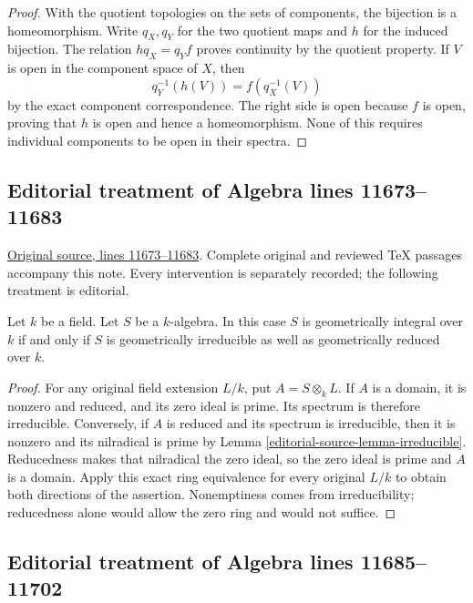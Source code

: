 \begin{proof}
With the quotient topologies
on the sets of components,
the bijection is a homeomorphism.
Write $q_X,q_Y$ for the two
quotient maps and $h$ for
the induced bijection.
The relation $h q_X=q_Y f$
proves continuity by the
quotient property. If $V$
is open in the component
space of $X$, then
$$
q_Y^{-1}(h(V))=f(q_X^{-1}(V))
$$
by the exact component
correspondence. The right
side is open because $f$
is open, proving that $h$
is open and hence a
homeomorphism. None of this
requires individual components
to be open in their spectra.
\end{proof}


\subsection{Editorial treatment of Algebra lines 11673--11683}

\hypertarget{algebra-context-154}{}

\noindent\href{https://github.com/stacks/stacks-project/blob/a04446e57ec1fbc252a871afcec7752fb2807b14/algebra.tex\#L11673}{Original source, lines 11673--11683}. Complete original and reviewed TeX passages accompany this note. Every intervention is separately recorded; the following treatment is editorial.


\begin{lemma}
\label{editorial-source-lemma-geometrically-integral}
Let $k$ be a field.
Let $S$ be a $k$-algebra.
In this case $S$ is geometrically integral over $k$ if and only if
$S$ is geometrically irreducible as well as geometrically reduced over $k$.
\end{lemma}

\begin{proof}
For any original field extension $L/k$,
put $A=S\otimes_k L$. If $A$ is
a domain, it is nonzero and reduced,
and its zero ideal is prime. Its
spectrum is therefore irreducible.
Conversely, if $A$ is reduced and
its spectrum is irreducible, then
it is nonzero and its nilradical
is prime by Lemma \ref{editorial-source-lemma-irreducible}.
Reducedness makes that nilradical
the zero ideal, so the zero ideal
is prime and $A$ is a domain.
Apply this exact ring equivalence
for every original $L/k$ to obtain
both directions of the assertion.
Nonemptiness comes from irreducibility;
reducedness alone would allow the
zero ring and would not suffice.
\end{proof}


\subsection{Editorial treatment of Algebra lines 11685--11702}

